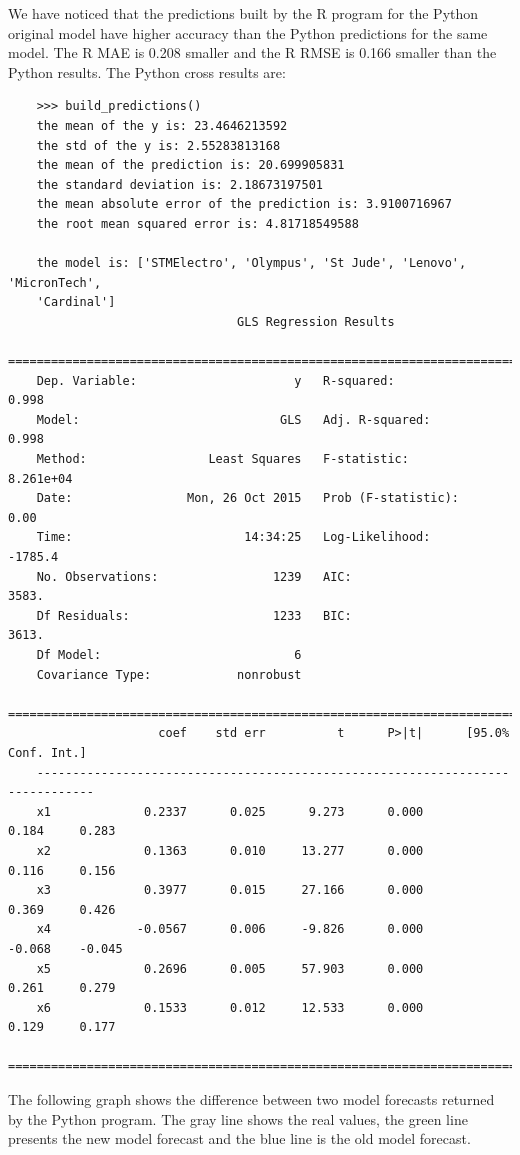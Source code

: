 \documentclass[
  twoside,
  11pt, a4paper,
  footinclude=true,
  headinclude=true,
  cleardoublepage=empty
]{scrreprt}
\begin{document}
    We have noticed that the predictions built by the R program for the Python original model have higher accuracy than the Python predictions for the same model. The R MAE is 0.208 smaller and the R RMSE is 0.166 smaller than the Python results.
    The Python cross results are:
    \begin{verbatim}
    >>> build_predictions()
    the mean of the y is: 23.4646213592
    the std of the y is: 2.55283813168
    the mean of the prediction is: 20.699905831
    the standard deviation is: 2.18673197501
    the mean absolute error of the prediction is: 3.9100716967
    the root mean squared error is: 4.81718549588
    
    the model is: ['STMElectro', 'Olympus', 'St Jude', 'Lenovo', 'MicronTech',
    'Cardinal']
                                GLS Regression Results                            
    ==============================================================================
    Dep. Variable:                      y   R-squared:                       0.998
    Model:                            GLS   Adj. R-squared:                  0.998
    Method:                 Least Squares   F-statistic:                 8.261e+04
    Date:                Mon, 26 Oct 2015   Prob (F-statistic):               0.00
    Time:                        14:34:25   Log-Likelihood:                -1785.4
    No. Observations:                1239   AIC:                             3583.
    Df Residuals:                    1233   BIC:                             3613.
    Df Model:                           6                                         
    Covariance Type:            nonrobust                                         
    ==============================================================================
                     coef    std err          t      P>|t|      [95.0% Conf. Int.]
    ------------------------------------------------------------------------------
    x1             0.2337      0.025      9.273      0.000         0.184     0.283
    x2             0.1363      0.010     13.277      0.000         0.116     0.156
    x3             0.3977      0.015     27.166      0.000         0.369     0.426
    x4            -0.0567      0.006     -9.826      0.000        -0.068    -0.045
    x5             0.2696      0.005     57.903      0.000         0.261     0.279
    x6             0.1533      0.012     12.533      0.000         0.129     0.177
    ==============================================================================
    \end{verbatim}
    The following graph shows the difference between two model forecasts returned by the Python program. The gray line shows the real values, the green line presents the new model forecast and the blue line is the old model forecast.
    
\end{document}
